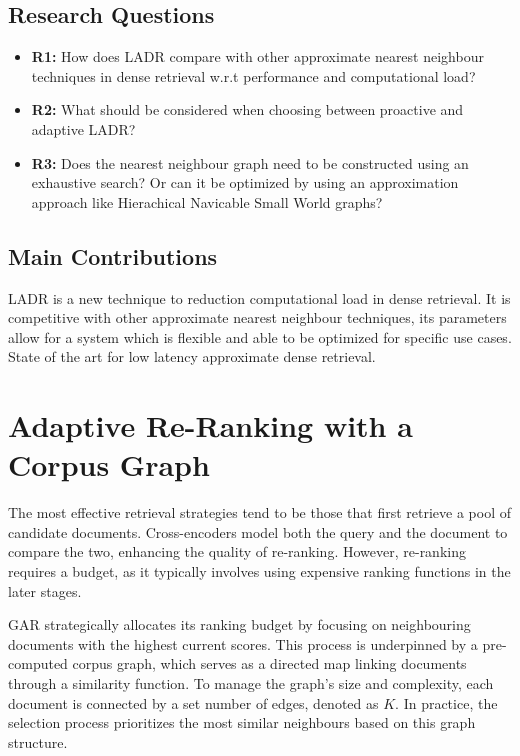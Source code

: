 \documentclass[sigconf,authorversion,nonacm]{acmart}
\begin{document}
\subsection{Research Questions}

\begin{itemize}

	\item \textbf{R1:} How does LADR compare with other approximate nearest neighbour techniques in
	      dense retrieval w.r.t performance and computational load?

	\item \textbf{R2:} What should be considered when choosing between proactive and adaptive LADR?

	\item \textbf{R3:} Does the nearest neighbour graph need to be constructed using an exhaustive
	      search? Or can it be optimized by using an approximation approach like Hierachical
	      Navicable Small World graphs?\cite{hnsw}

\end{itemize}


\subsection{Main Contributions}

LADR is a new technique to reduction computational load in dense retrieval. It is competitive with
other approximate nearest neighbour techniques, its parameters allow for a system which is flexible
and able to be optimized for specific use cases. State of the art for low latency approximate dense
retrieval.

\section{Adaptive Re-Ranking with a Corpus Graph}

The most effective retrieval strategies tend to be those that first retrieve a pool of candidate
documents. Cross-encoders model both the query and the document to compare the two, enhancing the
quality of re-ranking. However, re-ranking requires a budget, as it typically involves using
expensive ranking functions in the later stages.

GAR strategically allocates its ranking budget by focusing on neighbouring documents with the highest
current scores. This process is underpinned by a pre-computed corpus graph, which serves as a
directed map linking documents through a similarity function. To manage the graph's size and
complexity, each document is connected by a set number of edges, denoted as \(K\). In practice, the
selection process prioritizes the most similar neighbours based on this graph structure.
\end{document}
